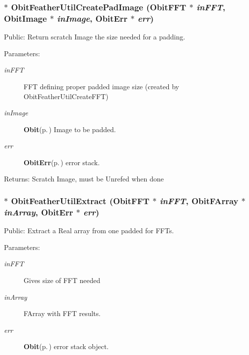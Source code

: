 \subsubsection{$\ast$ Obit\-Feather\-Util\-Create\-Pad\-Image ({\bf Obit\-FFT} $\ast$ {\em in\-FFT}, {\bf Obit\-Image} $\ast$ {\em in\-Image}, {\bf Obit\-Err} $\ast$ {\em err})}\label{ObitFeatherUtil_8h_a1}


Public: Return scratch Image the size needed for a padding. 

\begin{Desc}
\item[Parameters:]
\begin{description}
\item[{\em in\-FFT}]FFT defining proper padded image size (created by Obit\-Feather\-Util\-Create\-FFT) \item[{\em in\-Image}]{\bf Obit}{\rm (p.\,\pageref{structObit})} Image to be padded. \item[{\em err}]{\bf Obit\-Err}{\rm (p.\,\pageref{structObitErr})} error stack. \end{description}
\end{Desc}
\begin{Desc}
\item[Returns:]Scratch Image, must be Unrefed when done \end{Desc}
\subsubsection{$\ast$ Obit\-Feather\-Util\-Extract ({\bf Obit\-FFT} $\ast$ {\em in\-FFT}, {\bf Obit\-FArray} $\ast$ {\em in\-Array}, {\bf Obit\-Err} $\ast$ {\em err})}\label{ObitFeatherUtil_8h_a6}


Public: Extract a Real array from one padded for FFTs. 

\begin{Desc}
\item[Parameters:]
\begin{description}
\item[{\em in\-FFT}]Gives size of FFT needed \item[{\em in\-Array}]FArray with FFT results. \item[{\em err}]{\bf Obit}{\rm (p.\,\pageref{structObit})} error stack object. \end{description}
\end{Desc}

